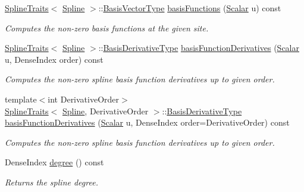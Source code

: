 \begin{DoxyCompactItemize}
\hyperlink{struct_eigen_1_1_spline_traits}{Spline\+Traits}$<$ \hyperlink{group___splines___module_class_eigen_1_1_spline}{Spline} $>$\+::\hyperlink{group___splines___module_a1d49cef942ea59d85d1711ee32354e6b}{Basis\+Vector\+Type} \hyperlink{group___splines___module_afe0997f0bb02a3fac3073016abac04c6}{basis\+Functions} (\hyperlink{group___splines___module_a8cafd78b564825c76fbb3419653d9742}{Scalar} u) const
\begin{DoxyCompactList}\small\item\em Computes the non-\/zero basis functions at the given site. \end{DoxyCompactList}\item 
\hyperlink{struct_eigen_1_1_spline_traits}{Spline\+Traits}$<$ \hyperlink{group___splines___module_class_eigen_1_1_spline}{Spline} $>$\+::\hyperlink{group___splines___module_a9db0b0108353660cd03524f2e67d6b3c}{Basis\+Derivative\+Type} \hyperlink{group___splines___module_a17d416e814d1ee957e5b309dc423751f}{basis\+Function\+Derivatives} (\hyperlink{group___splines___module_a8cafd78b564825c76fbb3419653d9742}{Scalar} u, Dense\+Index order) const
\begin{DoxyCompactList}\small\item\em Computes the non-\/zero spline basis function derivatives up to given order. \end{DoxyCompactList}\item 
{\footnotesize template$<$int Derivative\+Order$>$ }\\\hyperlink{struct_eigen_1_1_spline_traits}{Spline\+Traits}$<$ \hyperlink{group___splines___module_class_eigen_1_1_spline}{Spline}, Derivative\+Order $>$\+::\hyperlink{group___splines___module_a9db0b0108353660cd03524f2e67d6b3c}{Basis\+Derivative\+Type} \hyperlink{group___splines___module_acd36d8b5a4f57eb1d7f27989ac6d54ac}{basis\+Function\+Derivatives} (\hyperlink{group___splines___module_a8cafd78b564825c76fbb3419653d9742}{Scalar} u, Dense\+Index order=Derivative\+Order) const
\begin{DoxyCompactList}\small\item\em Computes the non-\/zero spline basis function derivatives up to given order. \end{DoxyCompactList}\item 
\mbox{\label{group___splines___module_a0df23e941ac0f31dcd095a4dd4f4a7ec}} 
Dense\+Index \hyperlink{group___splines___module_a0df23e941ac0f31dcd095a4dd4f4a7ec}{degree} () const
\begin{DoxyCompactList}\small\item\em Returns the spline degree. \end{DoxyCompactList}\item 

\end{DoxyCompactItemize}
